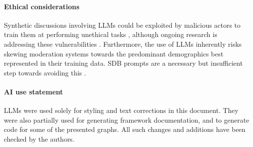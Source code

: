 %
\paragraph{Ethical considerations} 
Synthetic discussions involving LLMs could be exploited by malicious actors to train them at performing unethical tasks \cite{majumdar_2024_nefarious, MARULLI20245340, li_2025_vulnerable}, although ongoing research is addressing these vulnerabilities \cite{wang_2025_risk}. Furthermore, the use of LLMs inherently risks skewing moderation systems towards the predominant demographics best represented in their training data. SDB prompts are a necessary but insufficient step towards avoiding this \cite{rossi_2024, anthis_2025, burton2024large}.

\paragraph{AI use statement} LLMs were used solely for styling and text corrections in this document. They were also partially used for generating framework documentation, and to generate code for some of the presented graphs. All such changes and additions have been checked by the authors.
